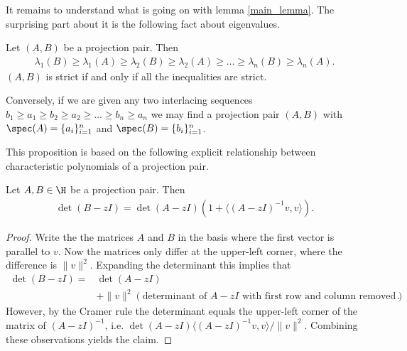 It remains to understand what is going on with lemma \ref{main_lemma}. The surprising part about it is the following fact about eigenvalues.

\begin{lem}\label{projection_eigenvalues}
	Let $(A, B)$ be a projection pair. Then
	\begin{align*}
		\lambda_{1}(B) \geq \lambda_{1}(A) \geq \lambda_{2}(B) \geq \lambda_{2}(A) \geq \ldots \geq \lambda_{n}(B) \geq \lambda_{n}(A).
	\end{align*}
	$(A, B)$ is strict if and only if all the inequalities are strict.

	Conversely, if we are given any two interlacing sequences $b_{1} \geq a_{1} \geq b_{2} \geq a_{2} \geq \ldots \geq b_{n} \geq a_{n}$ we may find a projection pair $(A, B)$ with $\spec(A) = \{a_{i}\}_{i = 1}^{n}$ and $\spec(B) = \{b_{i}\}_{i = 1}^{n}$.
\end{lem}

This proposition is based on the following explicit relationship between characteristic polynomials of a projection pair.

\begin{lem}\label{projection_characteristic_polynomial}
	Let $A, B \in \H$ be a projection pair. Then
	\begin{align*}
		\det(B - z I) = \det(A - z I) \left(1 + \langle (A - z I)^{-1}v, v\rangle\right).
	\end{align*}
\end{lem}
\begin{proof}
	Write the the matrices $A$ and $B$ in the basis where the first vector is parallel to $v$. Now the matrices only differ at the upper-left corner, where the difference is $\|v\|^2$. Expanding the determinant this implies that
	\begin{align*}
		\det(B - z I) =& \det(A - z I) \\
		&+ \|v\|^2 \left(\text{determinant of $A - zI$ with first row and column removed} \right).
	\end{align*}
	However, by the Cramer rule the determinant equals the upper-left corner of the matrix of $(A - z I)^{-1}$, i.e. $\det(A - z I) \langle (A - zI)^{-1} v, v \rangle/\|v\|^2$. Combining these observations yields the claim.
\end{proof}

